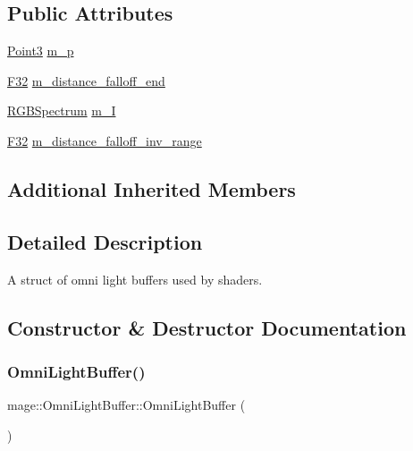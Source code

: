 \subsection*{Public Attributes}
\begin{DoxyCompactItemize}
\item 
\hyperlink{structmage_1_1_point3}{Point3} \hyperlink{structmage_1_1_omni_light_buffer_a777b98a686a7e39bd7b401748629d9fc}{m\+\_\+p}
\item 
\hyperlink{namespacemage_aa97e833b45f06d60a0a9c4fc22ae02c0}{F32} \hyperlink{structmage_1_1_omni_light_buffer_a750cefd32f2ab54b08afdfc1fae58587}{m\+\_\+distance\+\_\+falloff\+\_\+end}
\item 
\hyperlink{structmage_1_1_r_g_b_spectrum}{R\+G\+B\+Spectrum} \hyperlink{structmage_1_1_omni_light_buffer_ac3273113ad647103c911bbbf6bb41697}{m\+\_\+I}
\item 
\hyperlink{namespacemage_aa97e833b45f06d60a0a9c4fc22ae02c0}{F32} \hyperlink{structmage_1_1_omni_light_buffer_a4dc8e385dc74c2a731b4c9306765c3d8}{m\+\_\+distance\+\_\+falloff\+\_\+inv\+\_\+range}
\end{DoxyCompactItemize}
\subsection*{Additional Inherited Members}


\subsection{Detailed Description}
A struct of omni light buffers used by shaders. 

\subsection{Constructor \& Destructor Documentation}
\hypertarget{structmage_1_1_omni_light_buffer_a2cb95cb8ba07182d04b610b1c4c49be1}{}\label{structmage_1_1_omni_light_buffer_a2cb95cb8ba07182d04b610b1c4c49be1} 
\subsubsection{\texorpdfstring{Omni\+Light\+Buffer()}{OmniLightBuffer()}\hspace{0.1cm}{\footnotesize\ttfamily [1/3]}}
{\footnotesize\ttfamily mage\+::\+Omni\+Light\+Buffer\+::\+Omni\+Light\+Buffer (\begin{DoxyParamCaption}{ }\end{DoxyParamCaption})}

